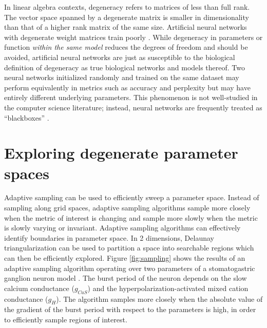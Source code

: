 \documentclass[a4paper,10pt]{article} %
\begin{document}
\FloatBarrier

In linear algebra contexts, degeneracy refers to matrices of less than full rank.
The vector space spanned by a degenerate matrix is smaller in dimensionality
than that of a higher rank matrix of the same size.
Artificial neural networks with degenerate weight matrices train poorly
\parencite{orhanSkipConnectionsEliminate2018a, penningtonResurrectingSigmoidDeep2017, saxeExactSolutionsNonlinear2014}.
While degeneracy in parameters or function \textit{within the same model}
reduces the degrees of freedom and should be avoided,
artificial neural networks are just as susceptible to the biological definition of degeneracy
as true biological networks and models thereof.
Two neural networks initialized randomly and trained on the same dataset
may perform equivalently in metrics such as accuracy and perplexity
but may have entirely different underlying parameters.
This phenomenon is not well-studied in the computer science literature;
instead, neural networks are frequently treated as ``blackboxes''
\parencite{novakSensitivityGeneralizationNeural2018, baiUsingPerturbedSystem2009}.

\section{Exploring degenerate parameter spaces}

Adaptive sampling can be used to efficiently sweep a parameter space.
Instead of sampling along grid spaces, adaptive sampling algorithms
sample more closely when the metric of interest is changing
and sample more slowly when the metric is slowly varying or invariant.
Adaptive sampling algorithms can effectively identify boundaries in parameter space.
In 2 dimensions, Delaunay triangularization can be used to partition a space into searchable regions
which can then be efficiently explored.
Figure \ref{fig:sampling} shows the results of an adaptive sampling algorithm
operating over two parameters of a stomatogastric ganglion neuron model
\parencite{liuModelNeuronActivityDependent1998}.
The burst period of the neuron depends on the slow calcium conductance ($g_{CaS}$)
and the hyperpolarization-activated mixed cation conductance ($g_H$).
The algorithm samples more closely when the absolute value of the gradient of the burst period
with respect to the parameters is high,
in order to efficiently sample regions of interest.
\end{document}
